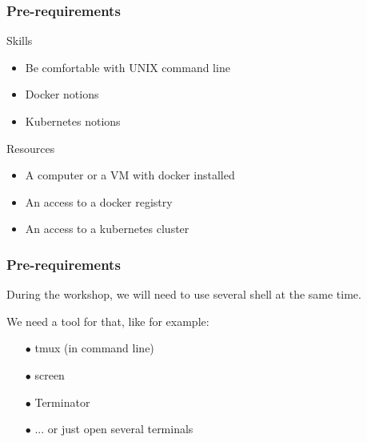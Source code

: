 
	\begin{frame}
		\frametitle{Pre-requirements}

		\begin{block}{Skills}
			\begin{itemize}
				\item Be comfortable with UNIX command line
				\item Docker notions
				\item Kubernetes notions
			\end{itemize}
		\end{block}
		
		\begin{block}{Resources}
			\begin{itemize}
				\item A computer or a VM with docker installed
				\item An access to a docker registry
				\item An access to a kubernetes cluster
			\end{itemize}
		\end{block}
		
	\end{frame}
	
	\begin{frame}
		\frametitle{Pre-requirements}
		
		During the workshop, we will need to use several shell at the same time.
		
		\medskip
		
		We need a tool for that, like for example:
		\begin{itemize}
			\item[$\bullet$] tmux (in command line)
			\item[$\bullet$] screen
			\item[$\bullet$] Terminator
			\item[$\bullet$] ... or just open several terminals
		\end{itemize}
	\end{frame}
